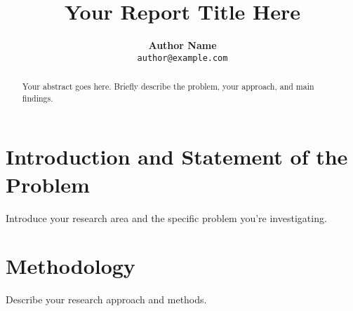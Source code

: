 \documentclass[midterm]{sparreport}
\title{Your Report Title Here}
\author{
  \textbf{Author Name}\\
  \texttt{author@example.com}
}
\begin{document}
\maketitle

\begin{abstract}
Your abstract goes here. Briefly describe the problem, your approach, and main findings.
\end{abstract}


\section{Introduction and Statement of the Problem}

Introduce your research area and the specific problem you're investigating.

\section{Methodology}

Describe your research approach and methods.

\end{document}
